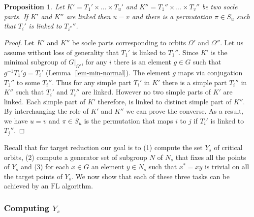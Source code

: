 \documentclass[11pt]{madras}%
\newtheorem{proposition}[theorem]{Proposition}
\theoremstyle{remark}
\newcommand{\pr}[2]{{\ensuremath{\left.{#1}\right\vert_{#2}}}}
\begin{document}
\begin{proposition}\label{prop-link-socles}
  Let $K' = T_1' \times \ldots \times T_u'$ and $K'' = T_1'' \times
  \ldots \times T_v''$ be two socle parts. If $K'$ and $K''$ are
  linked then $u = v$ and there is a permutation $\pi \in S_u$ such
  that $T_i'$ is linked to $T_{i^\pi}''$.
\end{proposition}
\begin{proof}
  Let $K'$ and $K''$ be socle parts corresponding to orbits $\Omega'$
  and $\Omega''$.  Let us assume without loss of generality that
  $T_1'$ is linked to $T_1''$. Since $K'$ is the minimal subgroup of
  $\pr{G}{\Omega'}$, for any $i$ there is an element $g \in G$ such
  that $g^{-1}T_1'g = T_i'$ (Lemma~\ref{lem-min-normal}). The element
  $g$ maps via conjugation $T_1''$ to some $T_i''$. Thus for any
  simple part $T_i'$ in $K'$ there is a simple part $T_i''$ in $K''$
  such that $T_i'$ and $T_i''$ are linked. However no two simple parts
  of $K'$ are linked. Each simple part of $K'$ therefore, is linked to
  distinct simple part of $K''$.  By interchanging the role of $K'$
  and $K''$ we can prove the converse.  As a result, we have $u = v$
  and $\pi \in S_u$ is the permutation that maps $i$ to $j$ if $T_i'$
  is linked to $T_j''$.
\end{proof}


Recall that for target reduction our goal is to (1) compute the set
$Y_s$ of critical orbits, (2) compute a generator set of subgroup $N$
of $N_s$ that fixes all the points of $Y_s$ and (3) for each $x \in G$
an element $y \in N_s$ such that $x^* = xy$ is trivial on all the
target points of $Y_s$. We now show that each of these three tasks can
be achieved by an $\mathrm{FL}$ algorithm.

\subsubsection{Computing $Y_s$} 
\end{document}
